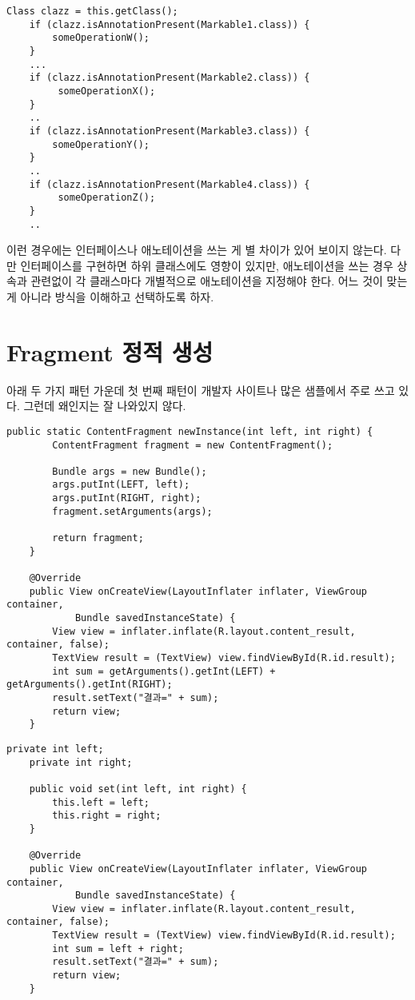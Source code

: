 \begin{lstlisting}[frame=single]
	Class clazz = this.getClass();
	if (clazz.isAnnotationPresent(Markable1.class)) {
		someOperationW();	
	}
 	...
	if (clazz.isAnnotationPresent(Markable2.class)) {
		 someOperationX();
	}
	..
	if (clazz.isAnnotationPresent(Markable3.class)) {
		someOperationY();
	} 
	..
	if (clazz.isAnnotationPresent(Markable4.class)) {
		 someOperationZ();
	}
	..
\end{lstlisting}

이런 경우에는 인터페이스나 애노테이션을 쓰는 게 별 차이가 있어 보이지 않는다. 다만 인터페이스를 구현하면 하위 클래스에도 영향이 있지만, 애노테이션을 쓰는 경우 상속과 관련없이 각 클래스마다 개별적으로 애노테이션을 지정해야 한다. 어느 것이 맞는 게 아니라 방식을 이해하고 선택하도록 하자.

\section{Fragment 정적 생성}
아래 두 가지 패턴 가운데 첫 번째 패턴이 개발자 사이트나 많은 샘플에서 주로 쓰고 있다. 그런데 왜인지는 잘 나와있지 않다.
\begin{lstlisting}[frame=single]
   public static ContentFragment newInstance(int left, int right) {
        ContentFragment fragment = new ContentFragment();

        Bundle args = new Bundle();
        args.putInt(LEFT, left);
        args.putInt(RIGHT, right);
        fragment.setArguments(args);

        return fragment;
    }

    @Override
    public View onCreateView(LayoutInflater inflater, ViewGroup container, 
    		Bundle savedInstanceState) {
        View view = inflater.inflate(R.layout.content_result, container, false);
        TextView result = (TextView) view.findViewById(R.id.result);
        int sum = getArguments().getInt(LEFT) + getArguments().getInt(RIGHT);
        result.setText("결과=" + sum);
        return view;
    }
\end{lstlisting}

\begin{lstlisting}[frame=single]
    private int left;
    private int right;

    public void set(int left, int right) {
        this.left = left;
        this.right = right;
    }

    @Override
    public View onCreateView(LayoutInflater inflater, ViewGroup container, 
    		Bundle savedInstanceState) {
        View view = inflater.inflate(R.layout.content_result, container, false);
        TextView result = (TextView) view.findViewById(R.id.result);
        int sum = left + right;
        result.setText("결과=" + sum);
        return view;
    }
\end{lstlisting}

